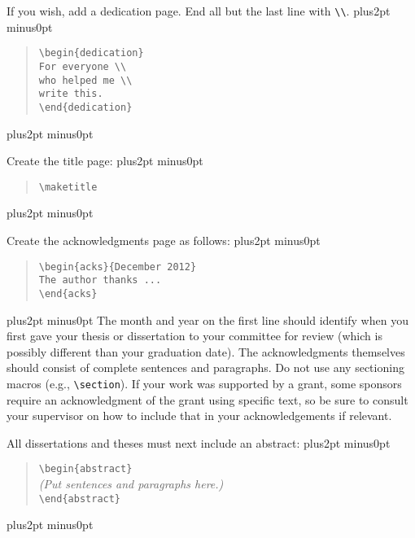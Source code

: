 \documentclass[doublespacing]{utdthesis}
\newenvironment{exampleclasscode}
 {\parindent=1cm\vskip0pt plus2pt minus0pt\begin{verse}}
 {\end{verse}\vskip0pt plus2pt minus0pt}
\begin{document}
If you wish, add a dedication page.
End all but the last line with \verb|\\|.
\begin{exampleclasscode}
\verb|\begin{dedication}| \\
\verb|For everyone \\| \\
\verb|who helped me \\| \\
\verb|write this.| \\
\verb|\end{dedication}|
\end{exampleclasscode}

Create the title page:
\begin{exampleclasscode}
\verb|\maketitle|
\end{exampleclasscode}

Create the acknowledgments page as follows:
\begin{exampleclasscode}
\verb|\begin{acks}{December 2012}| \\
\verb|The author thanks ...| \\
\verb|\end{acks}|
\end{exampleclasscode}
The month and year on the first line should identify when you first gave your
thesis or dissertation to your committee for review (which is possibly
different than your graduation date).
The acknowledgments themselves should consist of complete sentences and
paragraphs.
Do not use any sectioning macros (e.g., \verb|\section|).
If your work was supported by a grant, some sponsors require an
acknowledgment of the grant using specific text, so be sure to consult your
supervisor on how to include that in your acknowledgements if relevant.


All dissertations and theses must next include an abstract:
\begin{exampleclasscode}
\verb|\begin{abstract}| \\
\textit{(Put sentences and paragraphs here.)} \\
\verb|\end{abstract}|
\end{exampleclasscode}
\end{document}
